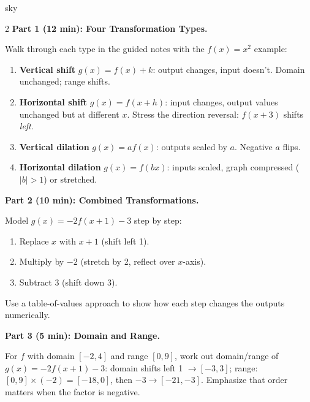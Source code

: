 \documentclass[10pt]{article}
\begin{document}
\begin{skillbox}[Lesson]{sky}
\begin{multicols}{2}
\textbf{Part 1 (12 min): Four Transformation Types.}

Walk through each type in the guided notes with the $f(x)=x^2$ example:
\begin{enumerate}[leftmargin=1.2em,itemsep=2pt,topsep=2pt]
  \item \textbf{Vertical shift} $g(x)=f(x)+k$: output changes, input doesn't. Domain unchanged; range shifts.
  \item \textbf{Horizontal shift} $g(x)=f(x+h)$: input changes, output values unchanged but at different $x$. Stress the direction reversal: $f(x+3)$ shifts \textit{left}.
  \item \textbf{Vertical dilation} $g(x)=af(x)$: outputs scaled by $a$. Negative $a$ flips.
  \item \textbf{Horizontal dilation} $g(x)=f(bx)$: inputs scaled, graph compressed ($|b|>1$) or stretched.
\end{enumerate}

\columnbreak

\textbf{Part 2 (10 min): Combined Transformations.}

Model $g(x)=-2f(x+1)-3$ step by step:
\begin{enumerate}[leftmargin=1.2em,itemsep=2pt,topsep=2pt]
  \item Replace $x$ with $x+1$ (shift left 1).
  \item Multiply by $-2$ (stretch by 2, reflect over $x$-axis).
  \item Subtract 3 (shift down 3).
\end{enumerate}

Use a table-of-values approach to show how each step changes the outputs numerically.

\textbf{Part 3 (5 min): Domain and Range.}

For $f$ with domain $[-2,4]$ and range $[0,9]$, work out domain/range of $g(x)=-2f(x+1)-3$:
domain shifts left 1 $\to [-3,3]$; range: $[0,9]\times(-2)=[-18,0]$, then $-3 \to [-21,-3]$.
Emphasize that order matters when the factor is negative.
\end{multicols}
\end{skillbox}
\end{document}
